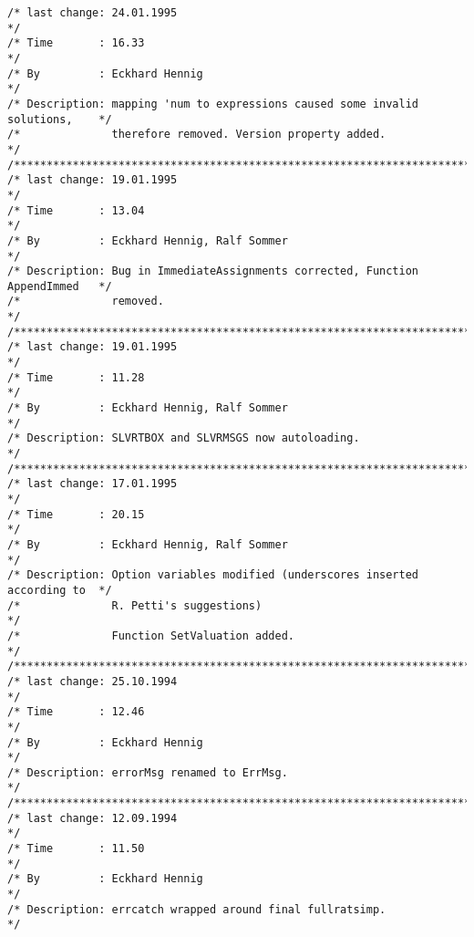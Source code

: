 \begin{verbatim}
/* last change: 24.01.1995                                                    */
/* Time       : 16.33                                                         */
/* By         : Eckhard Hennig                                                */
/* Description: mapping 'num to expressions caused some invalid solutions,    */
/*              therefore removed. Version property added.                    */
/******************************************************************************/
/* last change: 19.01.1995                                                    */
/* Time       : 13.04                                                         */
/* By         : Eckhard Hennig, Ralf Sommer                                   */
/* Description: Bug in ImmediateAssignments corrected, Function AppendImmed   */
/*              removed.                                                      */
/******************************************************************************/
/* last change: 19.01.1995                                                    */
/* Time       : 11.28                                                         */
/* By         : Eckhard Hennig, Ralf Sommer                                   */
/* Description: SLVRTBOX and SLVRMSGS now autoloading.                        */
/******************************************************************************/
/* last change: 17.01.1995                                                    */
/* Time       : 20.15                                                         */
/* By         : Eckhard Hennig, Ralf Sommer                                   */
/* Description: Option variables modified (underscores inserted according to  */
/*              R. Petti's suggestions)                                       */
/*              Function SetValuation added.                                  */
/******************************************************************************/
/* last change: 25.10.1994                                                    */
/* Time       : 12.46                                                         */
/* By         : Eckhard Hennig                                                */
/* Description: errorMsg renamed to ErrMsg.                                   */
/******************************************************************************/
/* last change: 12.09.1994                                                    */
/* Time       : 11.50                                                         */
/* By         : Eckhard Hennig                                                */
/* Description: errcatch wrapped around final fullratsimp.                    */

\end{verbatim}
